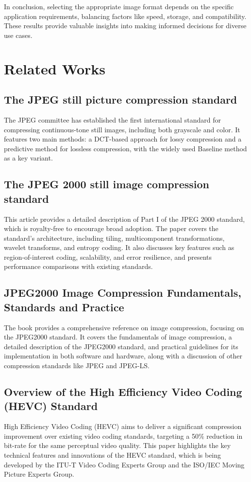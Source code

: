\documentclass[conference]{IEEEtran}
\begin{document}
In conclusion, selecting the appropriate image format depends on the specific application requirements, balancing factors like speed, storage, and compatibility. These results provide valuable insights into making informed decisions for diverse use cases.






\section{Related Works}

\subsection{The JPEG still picture compression standard \cite{hf06001}}
The JPEG committee has established the first international standard for compressing continuous-tone still images, including both grayscale and color. It features two main methods: a DCT-based approach for lossy compression and a predictive method for lossless compression, with the widely used Baseline method as a key variant.

\subsection{The JPEG 2000 still image compression standard \cite{hf06002}} 
This article provides a detailed description of Part I of the JPEG 2000 standard, which is royalty-free to encourage broad adoption. The paper covers the standard's architecture, including tiling, multicomponent transformations, wavelet transforms, and entropy coding. It also discusses key features such as region-of-interest coding, scalability, and error resilience, and presents performance comparisons with existing standards.

\subsection{JPEG2000 Image Compression Fundamentals, Standards and Practice \cite{hf06003}}
The book provides a comprehensive reference on image compression, focusing on the JPEG2000 standard. It covers the fundamentals of image compression, a detailed description of the JPEG2000 standard, and practical guidelines for its implementation in both software and hardware, along with a discussion of other compression standards like JPEG and JPEG-LS.

\subsection{Overview of the High Efficiency Video Coding (HEVC) Standard \cite{hf06004}} 
High Efficiency Video Coding (HEVC) aims to deliver a significant compression improvement over existing video coding standards, targeting a 50\% reduction in bit-rate for the same perceptual video quality. This paper highlights the key technical features and innovations of the HEVC standard, which is being developed by the ITU-T Video Coding Experts Group and the ISO/IEC Moving Picture Experts Group.
\end{document}
